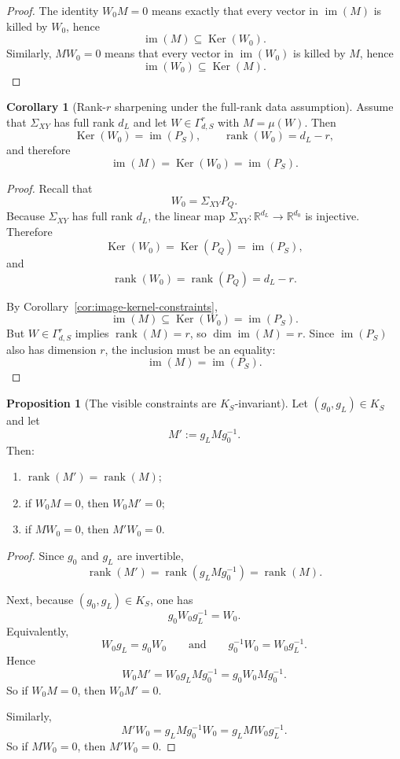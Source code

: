 \documentclass{article}
\newcommand{\rk}{\operatorname{rank}}
\newcommand{\R}{\mathbb{R}}
\newcommand{\im}{\operatorname{im}}
\newcommand{\Ker}{\operatorname{Ker}}
\theoremstyle{definition}
\newtheorem{proposition}[theorem]{Proposition}
\newtheorem{corollary}[theorem]{Corollary}
\begin{document}
\begin{proof}
The identity $W_0M=0$ means exactly that every vector in $\im(M)$ is killed by $W_0$, hence
\[
\im(M)\subseteq \Ker(W_0).
\]
Similarly, $MW_0=0$ means that every vector in $\im(W_0)$ is killed by $M$, hence
\[
\im(W_0)\subseteq \Ker(M).
\]
\end{proof}

\begin{corollary}[Rank-$r$ sharpening under the full-rank data assumption]\label{cor:rank-r-sharpening}
Assume that $\Sigma_{XY}$ has full rank $d_L$ and let $W\in \Gamma_{d,S}^r$ with $M=\mu(W)$. Then
\[
\Ker(W_0)=\im(P_S),
\qquad
\rk(W_0)=d_L-r,
\]
and therefore
\[
\im(M)=\Ker(W_0)=\im(P_S).
\]
\end{corollary}

\begin{proof}
Recall that
\[
W_0=\Sigma_{XY}P_Q.
\]
Because $\Sigma_{XY}$ has full rank $d_L$, the linear map $\Sigma_{XY}:\R^{d_L}\to \R^{d_0}$ is injective. Therefore
\[
\Ker(W_0)=\Ker(P_Q)=\im(P_S),
\]
and
\[
\rk(W_0)=\rk(P_Q)=d_L-r.
\]

By Corollary~\ref{cor:image-kernel-constraints},
\[
\im(M)\subseteq \Ker(W_0)=\im(P_S).
\]
But $W\in \Gamma_{d,S}^r$ implies $\rk(M)=r$, so $\dim \im(M)=r$. Since $\im(P_S)$ also has dimension $r$, the inclusion must be an equality:
\[
\im(M)=\im(P_S).
\]
\end{proof}

\begin{proposition}[The visible constraints are $K_S$-invariant]\label{prop:ks-invariance}
Let $(g_0,g_L)\in K_S$ and let
\[
M':=g_LMg_0^{-1}.
\]
Then:
\begin{enumerate}
\item $\rk(M')=\rk(M)$;
\item if $W_0M=0$, then $W_0M'=0$;
\item if $MW_0=0$, then $M'W_0=0$.
\end{enumerate}
\end{proposition}

\begin{proof}
Since $g_0$ and $g_L$ are invertible,
\[
\rk(M')=\rk(g_LMg_0^{-1})=\rk(M).
\]

Next, because $(g_0,g_L)\in K_S$, one has
\[
g_0W_0g_L^{-1}=W_0.
\]
Equivalently,
\[
W_0g_L=g_0W_0
\qquad\text{and}\qquad
g_0^{-1}W_0=W_0g_L^{-1}.
\]
Hence
\[
W_0M'=W_0g_LMg_0^{-1}=g_0W_0Mg_0^{-1}.
\]
So if $W_0M=0$, then $W_0M'=0$.

Similarly,
\[
M'W_0=g_LMg_0^{-1}W_0=g_LMW_0g_L^{-1}.
\]
So if $MW_0=0$, then $M'W_0=0$.
\end{proof}
\end{document}
